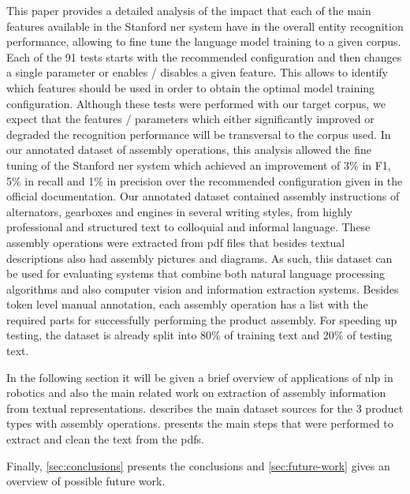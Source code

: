 This paper provides a detailed analysis of the impact that each of the main features available in the Stanford \gls{ner} system have in the overall entity recognition performance, allowing to fine tune the language model training to a given corpus. Each of the 91 tests starts with the recommended configuration and then changes a single parameter or enables / disables a given feature. This allows to identify which features should be used in order to obtain the optimal model training configuration. Although these tests were performed with our target corpus, we expect that the features / parameters which either significantly improved or degraded the recognition performance will be transversal to the corpus used. In our annotated dataset of assembly operations, this analysis allowed the fine tuning of the Stanford \gls{ner} system which achieved an improvement of 3\% in F1, 5\% in recall and 1\% in precision over the recommended configuration given in the official documentation. Our annotated dataset contained assembly instructions of alternators, gearboxes and engines in several writing styles, from highly professional and structured text to colloquial and informal language. These assembly operations were extracted from \gls{pdf} files that besides textual descriptions also had assembly pictures and diagrams. As such, this dataset can be used for evaluating systems that combine both natural language processing algorithms and also computer vision and information extraction systems. Besides token level manual annotation, each assembly operation has a list with the required parts for successfully performing the product assembly. For speeding up testing, the dataset is already split into 80\% of training text and 20\% of testing text.

In the following section it will be given a brief overview of applications of \gls{nlp} in robotics and also the main related work on extraction of assembly information from textual representations.  describes the main dataset sources for the 3 product types with assembly operations.  presents the main steps that were performed to extract and clean the text from the \glspl{pdf}.


Finally, \cref{sec:conclusions} presents the conclusions and \cref{sec:future-work} gives an overview of possible future work.
